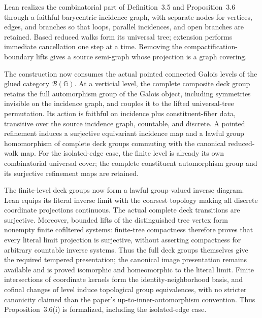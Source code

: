 \begin{definition}
  Lean realizes the combinatorial part of Definition~3.5 and
  Proposition~3.6 through a faithful barycentric incidence graph, with separate
  nodes for vertices, edges, and branches so that loops, parallel incidences,
  and open branches are retained.  Based reduced walks form its universal tree;
  extension performs immediate cancellation one step at a time.  Removing the
  compactification-boundary lifts gives a source semi-graph whose projection is
  a graph covering.

  The construction now consumes the actual pointed connected Galois levels of
  the glued category $\mathcal B(\mathbb G)$.  At a verticial level, the complete
  composite deck group retains the full automorphism group of the Galois object,
  including symmetries invisible on the incidence graph, and couples it to the
  lifted universal-tree permutation.  Its action is faithful on incidence plus
  constituent-fiber data, transitive over the source incidence graph, countable,
  and discrete.  A pointed refinement induces a surjective equivariant incidence
  map and a lawful group homomorphism of complete deck groups commuting with the
  canonical reduced-walk map.  For the isolated-edge case, the finite level is
  already its own combinatorial universal cover; the complete constituent
  automorphism group and its surjective refinement maps are retained.

  The finite-level deck groups now form a lawful group-valued inverse diagram.
  Lean equips its literal inverse limit with the coarsest topology making all
  discrete coordinate projections continuous.  The actual complete deck
  transitions are surjective.  Moreover, bounded lifts of the distinguished
  tree vertex form nonempty finite cofiltered systems: finite-tree compactness
  therefore proves that every literal limit projection is surjective, without
  asserting compactness for arbitrary countable inverse systems.  Thus the
  full deck groups themselves give the required tempered presentation; the
  canonical image presentation remains available and is proved isomorphic and
  homeomorphic to the literal limit.  Finite intersections of coordinate kernels
  form the identity-neighborhood basis, and cofinal changes of level induce
  topological group equivalences, with no stricter canonicity claimed than the
  paper's up-to-inner-automorphism convention.  Thus Proposition~3.6(i) is
  formalized, including the isolated-edge case.
  

\end{definition}
